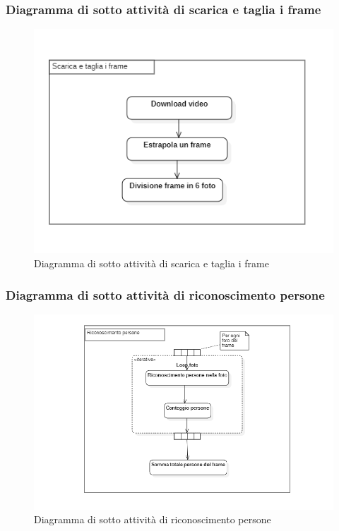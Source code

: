 \subsubsection{Diagramma di sotto attività di scarica e taglia i frame}\label{DiagrammaSottoAttivitaDownloadECutFrameVideo}
\begin{center}
	\begin{figure}[H]
		\centering\includegraphics[scale=0.8]
    {../immagini/diag_PB/download_e_cut_frames.png}
		\caption{Diagramma di sotto attività di scarica e taglia i frame}
	\end{figure}
\end{center}

\subsubsection{Diagramma di sotto attività di riconoscimento persone}\label{DiagrammaSottoAttivitaRiconoscimentoPersone}
\begin{center}
	\begin{figure}[H]
		\centering\includegraphics[scale=0.8]
    {../immagini/diag_PB/conta_persone.png}
		\caption{Diagramma di sotto attività di riconoscimento persone}
	\end{figure}
\end{center}


